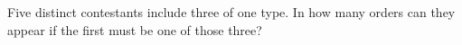 Five distinct contestants include three of one type. In how many orders can they appear if the first must be one of those three?

